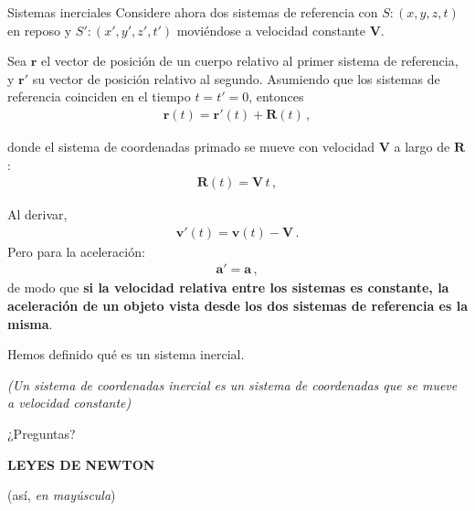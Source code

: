 \begin{frame}{Sistemas inerciales}
Considere ahora dos sistemas de referencia con $S:(x,y,z,t)$ en reposo
y $S':(x',y',z',t')$ moviéndose a velocidad constante
$\mathbf{V}$.
\vspace{1em}

    \pause Sea $\mathbf{r}$ el vector de posición de un cuerpo relativo al
primer sistema de referencia, y $\mathbf{r}'$ su vector de posición
relativo al segundo.
Asumiendo que los sistemas de referencia coinciden en el tiempo
$t=t'=0$, entonces
\begin{align}
  \mathbf{r}(t)=\mathbf{r}'(t)+\mathbf{R}(t)\,,
\end{align}

\pause donde el sistema de coordenadas primado se mueve con velocidad
$\mathbf{V}$ a largo de $\mathbf{R}$:
\begin{align}
  \mathbf{R}(t)=\mathbf{V}\, t\,,
\end{align}
\end{frame}

\begin{frame}
    Al derivar,
    \begin{align}
  \mathbf{v}'(t)=\mathbf{v}(t)-\mathbf{V}\,.
\end{align}
Pero para la aceleración:
\begin{align}
  \mathbf{a}'=\mathbf{a}\,,
\end{align} de modo que \textbf{si la velocidad relativa entre los sistemas es constante,
la aceleración de un objeto vista desde los dos sistemas de referencia
es la misma}.

\vspace{1em}

\begin{center}
    \Large Hemos definido qué es un sistema inercial.
\end{center}

\pause \textit{(Un sistema de coordenadas
inercial es un sistema de coordenadas que se mueve a velocidad
constante)}
\end{frame}

\begin{frame}
    \begin{center}
        \Huge ¿Preguntas?
    \end{center}
\end{frame}

\begin{frame}
    \begin{center}
        {\Huge \textbf{LEYES DE NEWTON}}
        
        (así, \textit{en mayúscula})
    \end{center}
\end{frame}

